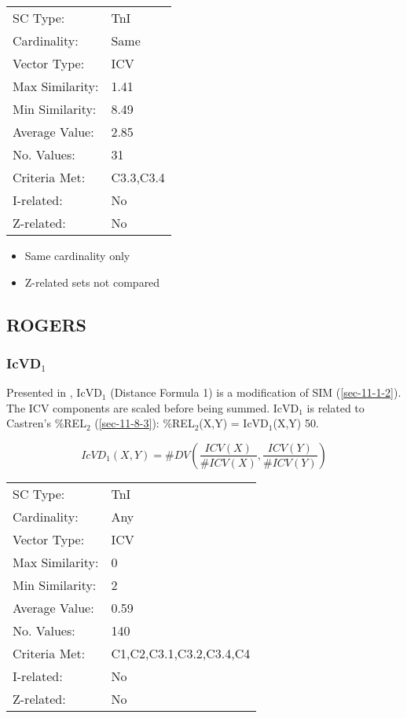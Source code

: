 \documentclass{article}
\begin{document}
\begin{center}
\begin{tabular}{ll}
 SC Type:         &  TnI        \\
 Cardinality:     &  Same       \\
 Vector Type:     &  ICV        \\
 Max Similarity:  &  1.41       \\
 Min Similarity:  &  8.49       \\
 Average Value:   &  2.85       \\
 No. Values:      &  31         \\
 Criteria Met:    &  C3.3,C3.4  \\
 I-related:       &  No         \\
 Z-related:       &  No         \\
\end{tabular}
\end{center}


\begin{itemize}
\item Same cardinality only
\item Z-related sets not compared
\end{itemize}
\subsection{ROGERS}
\label{sec-11-4}
\subsubsection{IcVD$_{1}$}
\label{sec-11-4-1}

Presented in \citet{Rogers1992}, IcVD$_{1}$ (Distance Formula 1) is a
modification of SIM (\ref{sec-11-1-2}). The ICV components are scaled before being
summed. IcVD$_{1}$ is related to Castren's \%REL$_{2}$ (\ref{sec-11-8-3}):
\%REL$_{2}$(X,Y) = IcVD$_{1}$(X,Y)\texttimes{} 50.  

$$IcVD_{1}(X,Y)=\#DV\left(\frac{ICV(X)}{\#ICV(X)},\frac{ICV(Y)}{\#ICV(Y)}\right)$$


\begin{center}
\begin{tabular}{ll}
 SC Type:         &  TnI                      \\
 Cardinality:     &  Any                      \\
 Vector Type:     &  ICV                      \\
 Max Similarity:  &  0                        \\
 Min Similarity:  &  2                        \\
 Average Value:   &  0.59                     \\
 No. Values:      &  140                      \\
 Criteria Met:    &  C1,C2,C3.1,C3.2,C3.4,C4  \\
 I-related:       &  No                       \\
 Z-related:       &  No                       \\
\end{tabular}
\end{center}
\end{document}
